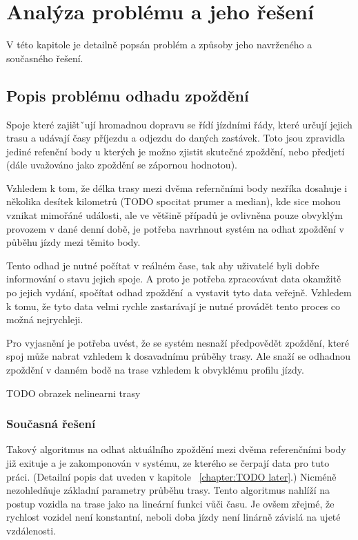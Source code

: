 
\chapter{Analýza problému a jeho řešení}

V této kapitole je detailně popsán problém a způsoby jeho navrženého a současného řešení.

\section{Popis problému odhadu zpoždění}

Spoje které zajištˇují hromadnou dopravu se řídí jízdními řády, které určují jejich trasu a udávají časy příjezdu a odjezdu do daných zastávek. Toto jsou zpravidla jediné refenční body u kterých je možno zjistit skutečné zpoždění, nebo předjetí (dále uvažováno jako zpoždění se zápornou hodnotou).

\bigbreak

Vzhledem k tom, že délka trasy mezi dvěma refernčními body nezříka dosahuje i několika desítek kilometrů (TODO spocitat prumer a median), kde sice mohou vznikat mimořáné události, ale ve většině případů je ovlivněna pouze obvyklým provozem v dané denní době, je potřeba navrhnout systém na odhat zpoždění v půběhu jízdy mezi těmito body.

\bigbreak

Tento odhad je nutné počítat v reálném čase, tak aby uživatelé byli dobře informování o stavu jejich spoje. A proto je potřeba zpracovávat data okamžitě po jejich vydání, spočítat odhad zpoždění a vystavit tyto data veřejně. Vzhledem k tomu, že tyto data velmi rychle zastarávají je nutné provádět tento proces co možná nejrychleji.

\bigbreak

Pro vyjasnění je potřeba uvést, že se systém nesnaží předpovědět zpoždění, které spoj může nabrat vzhledem k dosavadnímu průběhy trasy. Ale snaží se odhadnou zpoždění v danném bodě na trase vzhledem k obvyklému profilu jízdy.

TODO obrazek nelinearni trasy

\subsection{Současná řešení}

Takový algoritmus na odhat aktuálního zpoždění mezi dvěma referenčními body již exituje a je zakomponován v systému, ze kterého se čerpají data pro tuto práci. (Detailní popis dat uveden v kapitole ~\ref{chapter:TODO later}.) Nicméně nezohledňuje základní parametry průběhu trasy. Tento algoritmus nahlíží na postup vozidla na trase jako na lineární funkci vůči času. Je ovšem zřejmé, že rychlost vozidel není konstantní, neboli doba jízdy není linárně závislá na ujeté vzdálenosti.

